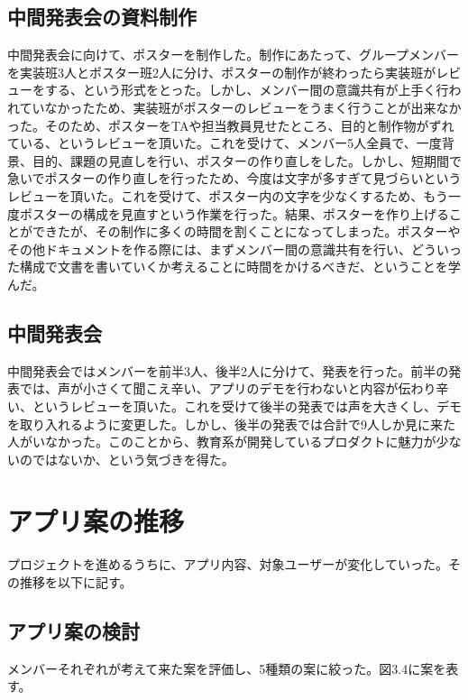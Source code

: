 \documentclass[openany,11pt,papersize]{jsbook}
\begin{document}

\subsection{中間発表会の資料制作}
\par 中間発表会に向けて、ポスターを制作した。制作にあたって、グループメンバーを実装班3人とポスター班2人に分け、ポスターの制作が終わったら実装班がレビューをする、という形式をとった。しかし、メンバー間の意識共有が上手く行われていなかったため、実装班がポスターのレビューをうまく行うことが出来なかった。そのため、ポスターをTAや担当教員見せたところ、目的と制作物がずれている、というレビューを頂いた。これを受けて、メンバー5人全員で、一度背景、目的、課題の見直しを行い、ポスターの作り直しをした。しかし、短期間で急いでポスターの作り直しを行ったため、今度は文字が多すぎて見づらいというレビューを頂いた。これを受けて、ポスター内の文字を少なくするため、もう一度ポスターの構成を見直すという作業を行った。結果、ポスターを作り上げることができたが、その制作に多くの時間を割くことになってしまった。ポスターやその他ドキュメントを作る際には、まずメンバー間の意識共有を行い、どういった構成で文書を書いていくか考えることに時間をかけるべきだ、ということを学んだ。


\subsection{中間発表会}
\par 中間発表会ではメンバーを前半3人、後半2人に分けて、発表を行った。前半の発表では、声が小さくて聞こえ辛い、アプリのデモを行わないと内容が伝わり辛い、というレビューを頂いた。これを受けて後半の発表では声を大きくし、デモを取り入れるように変更した。しかし、後半の発表では合計で9人しか見に来た人がいなかった。このことから、教育系が開発しているプロダクトに魅力が少ないのではないか、という気づきを得た。


\section{アプリ案の推移}
\par プロジェクトを進めるうちに、アプリ内容、対象ユーザーが変化していった。その推移を以下に記す。

\subsection{アプリ案の検討}
\par メンバーそれぞれが考えて来た案を評価し、5種類の案に絞った。図3.4に案を表す。
\end{document}
